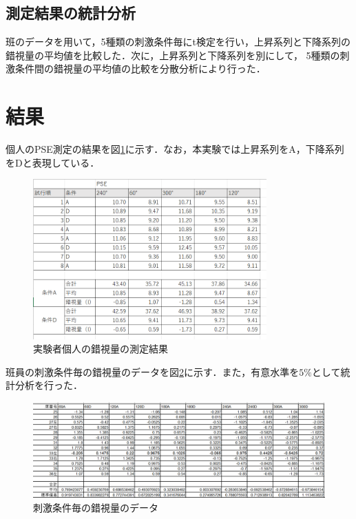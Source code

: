 \documentclass{jlreq}
\numberwithin{equation}{section}
\begin{document}
\subsection{測定結果の統計分析}
班のデータを用いて，5種類の刺激条件毎にt検定を行い，上昇系列と下降系列の錯視量の平均値を比較した．次に，上昇系列と下降系列を別にして，
5種類の刺激条件間の錯視量の平均値の比較を分散分析により行った．

\section{結果}
個人のPSE測定の結果を図\ref{fig:myPSE}に示す．なお，本実験では上昇系列をA，下降系列をDと表現している．

\begin{figure}[H]
  \centering
  \includegraphics[width=0.8\textwidth]{image/myPSE.png}
  \caption{実験者個人の錯視量の測定結果}
  \label{fig:myPSE}
\end{figure}

班員の刺激条件毎の錯視量のデータを図\ref{fig:group_data}に示す．また，有意水準を$5\si{\percent}$として統計分析を行った．
\begin{figure}[H]
  \centering
  \includegraphics[width=\textwidth]{image/錯視量_班員データ.png}
  \caption{刺激条件毎の錯視量のデータ}
  \label{fig:group_data}
\end{figure}
\end{document}
